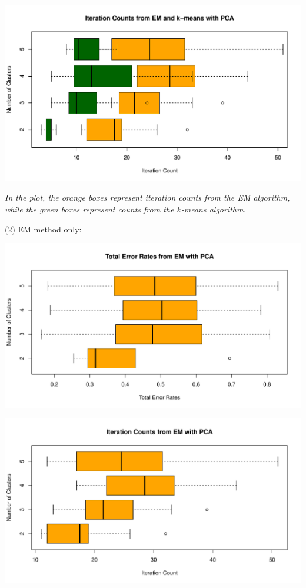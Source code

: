 \documentclass[a4paper,12pt]{article}
\begin{document}
\begin{center}
  \includegraphics[width=0.9\linewidth]{Image/Prob4-4-ItrCount-Ionosphere-Both.pdf}
  
   \parbox{0.9\textwidth}{\textit{In the plot, the \textcolor{myorange}{orange boxes} represent iteration counts from the EM algorithm, while the \textcolor{mydarkgreen}{green boxes} represent counts from the $k$-means algorithm.  
  }}
\end{center}
\bigskip

\noindent (2) EM method only:
\begin{center}
  \includegraphics[width=0.8\linewidth]{Image/Prob4-4-TotalErr-Ionosphere-EMPCA.pdf}
\end{center}
\begin{center}
  \includegraphics[width=0.8\linewidth]{Image/Prob4-4-ItrCount-Ionosphere-EMPCA.pdf}
\end{center}
\bigskip
\end{document}
